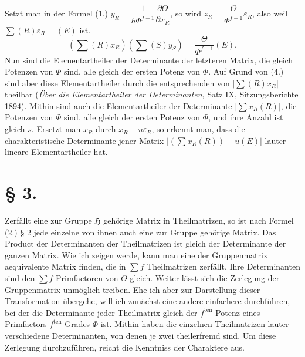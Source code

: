 \documentclass[11pt]{article}
\newcommand{\Hgrp}{\mathfrak{H}}
\newcommand{\eps}{\varepsilon}
\newcommand{\ten}{\mathrm{ten}}
\begin{document}
Setzt man in der Formel (1.) $y_R=\dfrac{1}{h\Phi^{f-1}}\dfrac{\partial\Theta}{\partial x_R}$, so wird $z_R=\dfrac{\Theta}{\Phi^{f-1}}\eps_R$, also weil $\sum(R)\eps_R=(E)$ ist.
\begin{equation}\tag{4.}
\left(\sum(R)x_R\right)\left(\sum(S)y_S\right)=\frac{\Theta}{\Phi^{f-1}}(E).
\end{equation}
Nun sind die Elementartheiler der Determinante der letzteren Matrix, die gleich Potenzen von $\Phi$ sind, alle gleich der ersten Potenz von $\Phi$. Auf Grund von (4.) sind aber diese Elementartheiler durch die entsprechenden von $\left|\sum(R)x_R\right|$ theilbar (\emph{Über die Elementartheiler der Determinanten}, Satz IX, Sitzungsberichte 1894). Mithin sind auch die Elementartheiler der Determinante $\left|\sum x_R(R)\right|$, die Potenzen von $\Phi$ sind, alle gleich der ersten Potenz von $\Phi$, und ihre Anzahl ist gleich $s$. Ersetzt man $x_R$ durch $x_R-u\eps_R$, so erkennt man, dass die charakteristische Determinante jener Matrix $\left|\left(\sum x_R(R)\right)-u(E)\right|$ lauter lineare Elementartheiler hat.

\section*{§ 3.}

Zerfällt eine zur Gruppe $\Hgrp$ gehörige Matrix in Theilmatrizen, so ist nach Formel (2.) § 2 jede einzelne von ihnen auch eine zur Gruppe gehörige Matrix. Das Product der Determinanten der Theilmatrizen ist gleich der Determinante der ganzen Matrix. Wie ich zeigen werde, kann man eine der Gruppenmatrix aequivalente Matrix finden, die in $\sum f$ Theilmatrizen zerfällt. Ihre Determinanten sind den $\sum f$ Primfactoren von $\Theta$ gleich. Weiter lässt sich die Zerlegung der Gruppenmatrix unmöglich treiben. Ehe ich aber zur Darstellung dieser Transformation übergehe, will ich zunächst eine andere einfachere durchführen, bei der die Determinante jeder Theilmatrix gleich der $f^{\ten}$ Potenz eines Primfactors $f^{\ten}$ Grades $\Phi$ ist. Mithin haben die einzelnen Theilmatrizen lauter verschiedene Determinanten, von denen je zwei theilerfremd sind. Um diese Zerlegung durchzuführen, reicht die Kenntniss der Charaktere aus.
\end{document}
